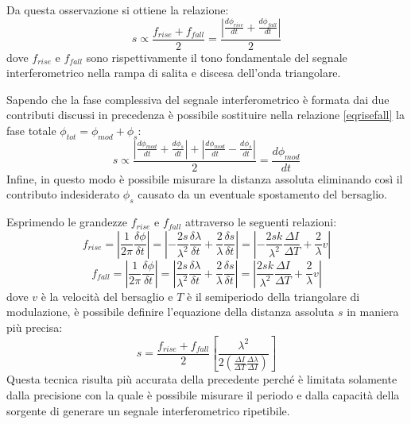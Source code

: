 \begin{enumerate}
Da questa osservazione si ottiene la relazione:
\begin{equation}
	s \propto \frac{f_{rise}+f_{fall}}{2} = \frac{ \left | \frac{d\phi_{rise}}{dt} + \frac{d\phi_{fall}}{dt} \right |}{2}
	\label{eqrisefall}
\end{equation}
dove $f_{rise}$ e $f_{fall}$ sono rispettivamente il tono fondamentale del segnale interferometrico nella rampa di salita e discesa dell'onda triangolare.

Sapendo che la fase complessiva del segnale interferometrico è formata dai due contributi discussi in precedenza è possibile sostituire nella relazione \ref{eqrisefall} la fase totale $\phi_{tot} = \phi_{mod} + \phi_s$:
\begin{equation}
	s \propto \frac{ \left | \frac{d\phi_{mod}}{dt} + \frac{d\phi_{s}}{dt} \right |+ \left | \frac{d\phi_{mod}}{dt} - \frac{d\phi_{s}}{dt} \right |}{2} = \frac{d\phi_{mod}}{dt}
\end{equation}
Infine, in questo modo è possibile misurare la distanza assoluta eliminando così il contributo indesiderato $\phi_s$ causato da un eventuale spostamento del bersaglio.

Esprimendo le grandezze $f_{rise}$ e $f_{fall}$ attraverso le seguenti relazioni:
\begin{equation}
	f_{rise}= \left | \frac{1}{2\pi} \frac{\delta \phi}{\delta t} \right | = \left | - \frac{2s}{\lambda^2} \frac{\delta \lambda}{\delta t} + \frac{2}{\lambda} \frac{\delta s}{\delta t} \right | = \left | - \frac{2sk}{\lambda^2} \frac{\Delta I}{\Delta T} + \frac{2}{\lambda}v \right |
\end{equation}
\begin{equation}
	f_{fall}= \left | \frac{1}{2\pi} \frac{\delta \phi}{\delta t} \right | = \left | \frac{2s}{\lambda^2} \frac{\delta \lambda}{\delta t} + \frac{2}{\lambda} \frac{\delta s}{\delta t} \right | = \left | \frac{2sk}{\lambda^2} \frac{\Delta I}{\Delta T} + \frac{2}{\lambda}v \right |
\end{equation}
dove $v$ è la velocità del bersaglio e $T$ è il semiperiodo della triangolare di modulazione, è possibile definire l'equazione della distanza assoluta $s$ in maniera più precisa:
\begin{equation}
	s = \frac{f_{rise}+f_{fall}}{2} \left [ \frac{\lambda^2}{2\left ( \frac{\Delta I}{\Delta T} \frac{\Delta \lambda}{\Delta I} \right )}  \right ]
\end{equation}
Questa tecnica risulta più accurata della precedente perché è limitata solamente dalla precisione con la quale è possibile misurare il periodo e dalla capacità della sorgente di generare un segnale interferometrico ripetibile. 

\end{enumerate}